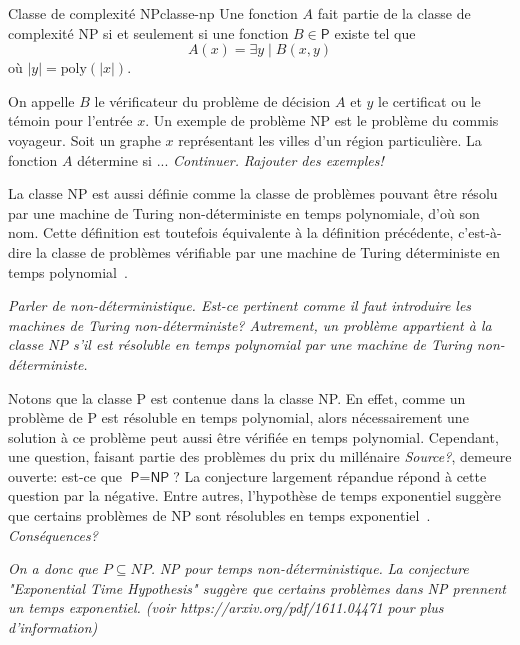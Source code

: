 \begin{maindefinition}{Classe de complexité \textsf{NP}}{classe-np}
    Une fonction $A$ fait partie de la classe de complexité \textsf{NP} si et seulement si une fonction $B \in  \textsf{P}$ existe tel que
    \begin{equation*}
        A(x) = \exists y \mid B(x,y)
    \end{equation*}
    où $\lvert y \rvert = \mathrm{poly}(\lvert x \rvert)$.
\end{maindefinition}

On appelle $B$ le vérificateur du problème de décision $A$ et $y$ le certificat ou le témoin pour l'entrée $x$. Un exemple de problème \textsf{NP} est le problème du commis voyageur. Soit un graphe $x$ représentant les villes d'un région particulière. La fonction $A$ détermine si ... \textcolor{mydarkred}{\textit{Continuer.}}
\textcolor{mydarkred}{\textit{Rajouter des exemples!}}

La classe \textsf{NP} est aussi définie comme la classe de problèmes pouvant être résolu par une machine de Turing non-déterministe en temps polynomiale, d'où son nom. Cette définition est toutefois équivalente à la définition précédente, c'est-à-dire la classe de problèmes vérifiable par une machine de Turing déterministe en temps polynomial~\cite{sipserIntroductionTheoryComputation2012}. 

\textcolor{mydarkred}{\textit{Parler de non-déterministique. Est-ce pertinent comme il faut introduire les machines de Turing non-déterministe? Autrement, un problème appartient à la classe \textsf{NP} s'il est résoluble en temps polynomial par une machine de Turing non-déterministe. }}

Notons que la classe \textsf{P} est contenue dans la classe \textsf{NP}. En effet, comme un problème de \textsf{P} est résoluble en temps polynomial, alors nécessairement une solution à ce problème peut aussi être vérifiée en temps polynomial. Cependant, une question, faisant partie des problèmes du prix du millénaire \textcolor{mydarkred}{\textit{Source?}}, demeure ouverte: est-ce que $\textsf{P} = \textsf{NP}$? La conjecture largement répandue répond à cette question par la négative. Entre autres, l'hypothèse de temps exponentiel suggère que certains problèmes de \textsf{NP} sont résolubles en temps exponentiel~\cite{impagliazzoComplexityKSAT2001}. \textcolor{mydarkred}{\textit{Conséquences?}}

\textcolor{mydarkred}{\textit{On a donc que $P \subseteq NP$.}}
\textcolor{mydarkred}{\textit{NP pour temps non-déterministique.}}
\textcolor{mydarkred}{\textit{La conjecture "Exponential Time Hypothesis" suggère que certains problèmes dans NP prennent un temps exponentiel.  (voir https://arxiv.org/pdf/1611.04471 pour plus d'information)}}

